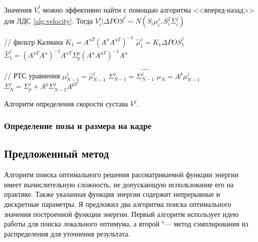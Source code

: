 Значения $\overline{V}_i^j$ можно эффективно найти с помощью алгоритма <<вперед-назад>> для ЛДС \ref{alg:velocity}. Тогда $V_i^j|\Delta\overline{POS}^j \sim N\left(S_i\mu_i^j, S_i^2 \Sigma_i^j \right)$
\begin{algorithm}[!t]
	
	// фильтр Калмана\;
	$K_1 = A^{uT} \left(A^u A^{uT}\right)^{-1}$\;
	$\hat{\mu}_1^j = K_1 \Delta \overline{POS}_1^j $\;
	$\hat{\Sigma}_1^j =
	\left(A^{uT} A^u\right)^{-1} A^{uT} \Sigma_p^p \left(A^u A^{uT}\right)^{-1} A^u$ \;
	
	// РТС уравнения
	$\mu_{N-1}^j = \hat{\mu}_{N-1}^j$\;
	$\Sigma_{N-1}^j = \hat{\Sigma_{N-1}^j}$\;
	$\mu_N = A^p \mu_{N-1}^j$\;
	$\Sigma_N^j = \Sigma_p^v + A^p \Sigma_{N-1}^j A^{pT}$\;
	\caption{Алгоритм определения скорости сустава $V^j$.} \label{alg:velocity}
\end{algorithm}

\subsubsection{Определение позы и размера на кадре}

\subsection{Предложенный метод}

Алгоритм поиска оптимального решения рассматриваемой функции энергии имеет вычислительную сложность, не допускающую использование его на практике. Также указанная функция энергии содержит непрерывные и дискретные параметры. Я предложил два алгоритма поиска оптимального значения построенной функции энергии. Первый алгоритм использует идею работы \cite{park2011n} для поиска локального оптимума, а второй "--- метод сэмплирования из распределения для уточнения результата.

